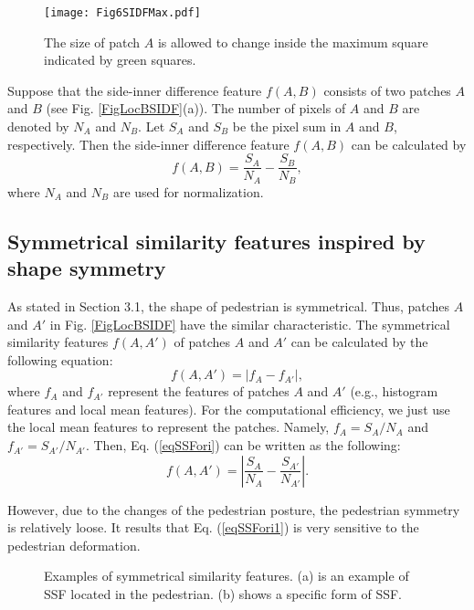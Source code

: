 \documentclass[10pt,twocolumn,letterpaper]{article}
\begin{document}
\begin{figure}[!t]
\centering
\texttt{[image: Fig6SIDFMax.pdf]}
\caption{The size of patch $A$ is allowed to change inside the maximum square indicated by green squares.}
\label{FigSIDFMax}
\end{figure}

Suppose that the side-inner difference feature $f(A,B)$ consists of two patches $A$ and $B$ (see Fig. \ref{FigLocBSIDF}(a)). The number of pixels of $A$ and $B$ are denoted by $N_A$ and $N_B$. Let $S_A$ and $S_B$ be the pixel sum in $A$ and $B$, respectively. Then the side-inner difference feature $f(A,B)$ can be calculated by
\begin{equation}
\label{eqSIDF}
f(A,B)=\frac{S_A}{N_A}-\frac{S_B}{N_B},
\end{equation}
where $N_A$ and $N_B$ are used for normalization. 

\subsection{Symmetrical similarity features inspired by shape symmetry}
As stated in Section 3.1, the shape of pedestrian is symmetrical. Thus, 
patches $A$ and $A'$ in Fig. \ref{FigLocBSIDF} have the 
similar characteristic. The symmetrical similarity features 
$f(A,A')$ of patches $A$ and $A'$ can be calculated by the following equation:
\begin{equation}
\label{eqSSFori}
f(A,A')=|f_A-f_{A'}|,
\end{equation}
where $f_A$ and $f_{A'}$ represent the features of patches 
$A$ and $A'$ (e.g., histogram features and local mean features). For the 
computational efficiency, we just use the local mean features to represent the patches. 
Namely, $f_A=S_A/N_A$ and $f_{A'}=S_{A'}/N_{A'}$. Then, Eq. (\ref{eqSSFori}) can 
be written as the following:
\begin{equation}
\label{eqSSFori1}
f(A,A')=|\frac{S_A}{N_A}-\frac{S_{A'}}{N_{A'}}|.
\end{equation}

However, due to the changes of the pedestrian posture, the pedestrian symmetry  is relatively loose. It results that Eq. (\ref{eqSSFori1}) is very sensitive to 
the pedestrian deformation. 

\begin{figure}[!t]
\centering
{}
\hfil
{}
\caption{Examples of symmetrical similarity features. (a) is an example of SSF located in the pedestrian. (b) shows a specific form of SSF.}
\label{FigSSF}
\end{figure}
\end{document}
